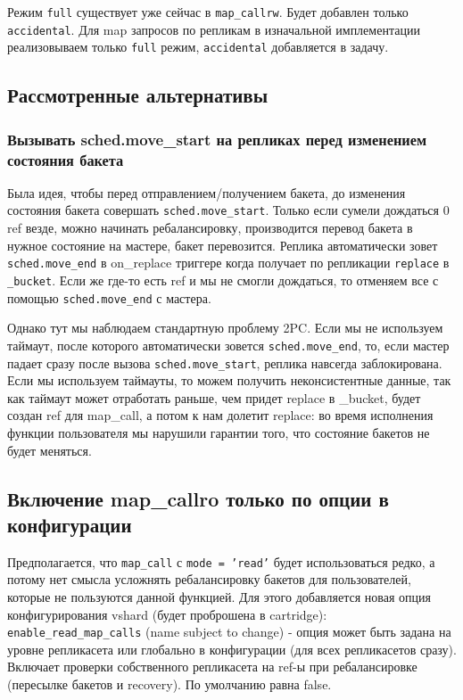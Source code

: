 Режим \texttt{full} существует уже сейчас в \texttt{map\_callrw}. Будет
добавлен только \texttt{accidental}. Для map запросов по репликам в изначальной
имплементации реализовываем только \texttt{full} режим, \texttt{accidental}
добавляется в задачу.

\subsection{Рассмотренные альтернативы}

\subsubsection*{Вызывать sched.move\_start на репликах перед изменением состояния бакета}

Была идея, чтобы перед отправлением/получением бакета, до изменения состояния
бакета совершать \texttt{sched.move\_start}. Только если сумели дождаться 0
ref везде, можно начинать ребалансировку, производится перевод бакета в
нужное состояние на мастере, бакет перевозится. Реплика автоматически зовет
\texttt{sched.move\_end} в on\_replace триггере когда получает по репликации
\texttt{replace} в \texttt{\_bucket}. Если же где-то есть ref и мы не смогли
дождаться, то отменяем все с помощью \texttt{sched.move\_end} с мастера.

Однако тут мы наблюдаем стандартную проблему 2PC. Если мы не используем
таймаут, после которого автоматически зовется \texttt{sched.move\_end}, то,
если мастер падает сразу после вызова \texttt{sched.move\_start}, реплика
навсегда заблокирована. Если мы используем таймауты, то можем получить
неконсистентные данные, так как таймаут может отработать раньше, чем придет
replace в \_bucket, будет создан ref для map\_call, а потом к нам долетит
replace: во время исполнения функции пользователя мы нарушили гарантии того,
что состояние бакетов не будет меняться.

\subsection*{Включение map\_callro только по опции в конфигурации}

Предполагается, что \texttt{map\_call} с \texttt{mode = 'read'} будет
использоваться редко, а потому нет смысла усложнять ребалансировку бакетов для
пользователей, которые не пользуются данной функцией. Для этого добавляется
новая опция конфигурирования vshard (будет проброшена в cartridge):
\texttt{enable\_read\_map\_calls} (name subject to change) - опция может быть
задана на уровне репликасета или глобально в конфигурации (для всех
репликасетов сразу). Включает проверки собственного репликасета на ref-ы при
ребалансировке (пересылке бакетов и recovery). По умолчанию равна false.

